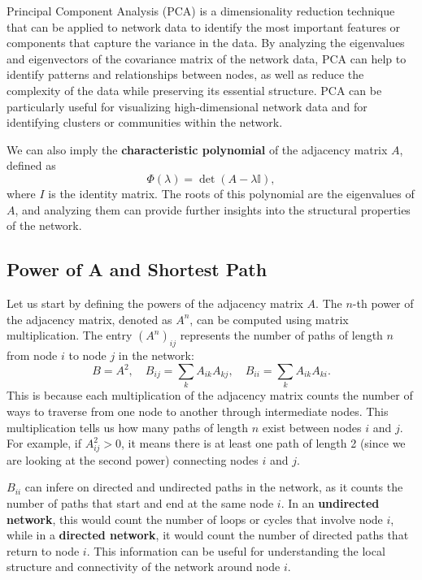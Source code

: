 \begin{example}
    Principal Component Analysis (PCA) is a dimensionality reduction technique that can be applied to network data to identify the most important features or components that capture the variance in the data. By analyzing the eigenvalues and eigenvectors of the covariance matrix of the network data, PCA can help to identify patterns and relationships between nodes, as well as reduce the complexity of the data while preserving its essential structure. PCA can be particularly useful for visualizing high-dimensional network data and for identifying clusters or communities within the network.
\end{example}

We can also imply the \textbf{characteristic polynomial} of the adjacency matrix \(A\), defined as
\[
    \Phi(\lambda) = \det(A - \lambda \mathbb{I}),
\]
where \(I\) is the identity matrix. The roots of this polynomial are the eigenvalues of \(A\), and analyzing them can provide further insights into the structural properties of the network.

\subsection{Power of A and Shortest Path}

Let us start by defining the powers of the adjacency matrix \(A\). The \(n\)-th power of the adjacency matrix, denoted as \(A^n\), can be computed using matrix multiplication. The entry \((A^n)_{ij}\) represents the number of paths of length \(n\) from node \(i\) to node \(j\) in the network:
\[
    B = A^2, \quad B_{ij} = \sum_{k} A_{ik} A_{kj}, \quad B_{ii} = \sum_{k} A_{ik} A_{ki}.
\]
This is because each multiplication of the adjacency matrix counts the number of ways to traverse from one node to another through intermediate nodes. This multiplication tells us how many paths of length \(n\) exist between nodes \(i\) and \(j\). For example, if \(A^2_{ij} > 0\), it means there is at least one path of length 2 (since we are looking at the second power) connecting nodes \(i\) and \(j\).

\(B_{ii}\) can infere on directed and undirected paths in the network, as it counts the number of paths that start and end at the same node \(i\). In an \textbf{undirected network}, this would count the number of loops or cycles that involve node \(i\), while in a \textbf{directed network}, it would count the number of directed paths that return to node \(i\). This information can be useful for understanding the local structure and connectivity of the network around node \(i\).

